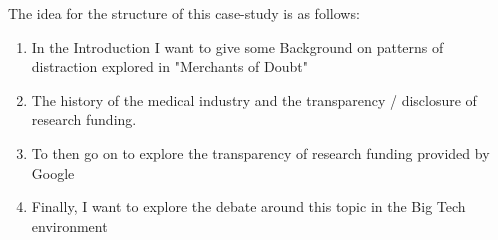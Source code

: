 The idea for the structure of this case-study is as follows:
\begin{enumerate}
    \item In the Introduction I want to give some Background on patterns of distraction explored in "Merchants of Doubt"
    \item The history of the medical industry and the transparency / disclosure of research funding.
    \item To then go on to explore the transparency of research funding provided by Google
    \item Finally, I want to explore the debate around this topic in the Big Tech environment
\end{enumerate}
